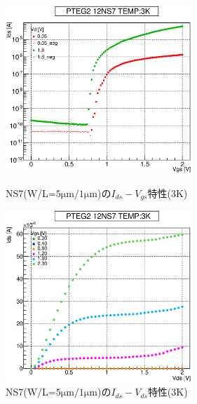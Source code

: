 				\begin{figure}[htbp]
					\begin{minipage}{0.5\hsize}
						\begin{center}
							\includegraphics[width=70mm]{./Chapter/Appendix/Picture/NST/NS7/PTEG2_12_NS7_IdVg_3K.eps}
						\end{center}
						\caption{NS7(W/L=$5\mathrm{\mu m}/1\mathrm{\mu m}$)の$I_{ds}-V_{gs}$特性(3K)}
						\label{fig:NS7_IdVg_3K}
					\end{minipage}
					\begin{minipage}{0.5\hsize}
						\begin{center}
							\includegraphics[width=70mm]{./Chapter/Appendix/Picture/NST/NS7/PTEG2_12_NS7_IdVd_3K.eps}
						\end{center}
						\caption{NS7(W/L=$5\mathrm{\mu m}/1\mathrm{\mu m}$)の$I_{ds}-V_{ds}$特性(3K)}
						\label{fig:NS7_IdVd_3K}
					\end{minipage}
				\end{figure}
